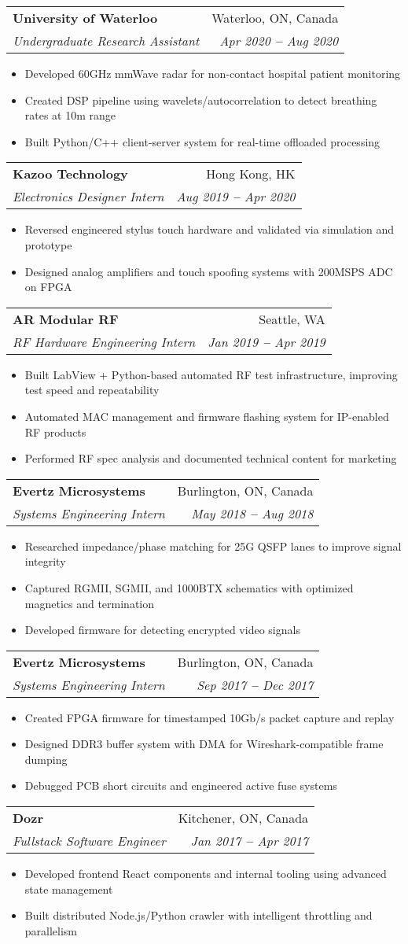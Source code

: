 \documentclass[letterpaper,11pt]{article}
\makeatletter
\newcommand{\resumeItem}[1]{
  \item\small{
    {#1 \vspace{-2pt}}
  }
}
\newcommand{\resumeSubheading}[4]{
  \vspace{-2pt}\item
    \begin{tabular*}{0.97\textwidth}[t]{l@{\extracolsep{\fill}}r}
      \textbf{#1} & #2 \\
      \textit{\small#3} & \textit{\small #4} \\
    \end{tabular*}\vspace{-7pt}
}
\newcommand{\resumeItemListStart}{\begin{itemize}}
\newcommand{\resumeItemListEnd}{\end{itemize}\vspace{-5pt}}
\makeatother
\begin{document}
  \resumeSubheading
    {University of Waterloo}{Waterloo, ON, Canada}
    {Undergraduate Research Assistant}{Apr 2020 \textbf{--} Aug 2020}
    \resumeItemListStart
      \resumeItem{Developed 60GHz mmWave radar for non-contact hospital patient monitoring}
      \resumeItem{Created DSP pipeline using wavelets/autocorrelation to detect breathing rates at 10m range}
      \resumeItem{Built Python/C++ client-server system for real-time offloaded processing}
    \resumeItemListEnd

  \resumeSubheading
    {Kazoo Technology}{Hong Kong, HK}
    {Electronics Designer Intern}{Aug 2019 \textbf{--} Apr 2020}
    \resumeItemListStart
      \resumeItem{Reversed engineered stylus touch hardware and validated via simulation and prototype}
      \resumeItem{Designed analog amplifiers and touch spoofing systems with 200MSPS ADC on FPGA}
    \resumeItemListEnd

  \resumeSubheading
    {AR Modular RF}{Seattle, WA}
    {RF Hardware Engineering Intern}{Jan 2019 \textbf{--} Apr 2019}
    \resumeItemListStart
      \resumeItem{Built LabView + Python-based automated RF test infrastructure, improving test speed and repeatability}
      \resumeItem{Automated MAC management and firmware flashing system for IP-enabled RF products}
      \resumeItem{Performed RF spec analysis and documented technical content for marketing}
    \resumeItemListEnd

  \resumeSubheading
    {Evertz Microsystems}{Burlington, ON, Canada}
    {Systems Engineering Intern}{May 2018 \textbf{--} Aug 2018}
    \resumeItemListStart
      \resumeItem{Researched impedance/phase matching for 25G QSFP lanes to improve signal integrity}
      \resumeItem{Captured RGMII, SGMII, and 1000BTX schematics with optimized magnetics and termination}
      \resumeItem{Developed firmware for detecting encrypted video signals}
    \resumeItemListEnd

  \resumeSubheading
    {Evertz Microsystems}{Burlington, ON, Canada}
    {Systems Engineering Intern}{Sep 2017 \textbf{--} Dec 2017}
    \resumeItemListStart
      \resumeItem{Created FPGA firmware for timestamped 10Gb/s packet capture and replay}
      \resumeItem{Designed DDR3 buffer system with DMA for Wireshark-compatible frame dumping}
      \resumeItem{Debugged PCB short circuits and engineered active fuse systems}
    \resumeItemListEnd

  \resumeSubheading
    {Dozr}{Kitchener, ON, Canada}
    {Fullstack Software Engineer}{Jan 2017 \textbf{--} Apr 2017}
    \resumeItemListStart
      \resumeItem{Developed frontend React components and internal tooling using advanced state management}
      \resumeItem{Built distributed Node.js/Python crawler with intelligent throttling and parallelism}
    \resumeItemListEnd
\end{document}
